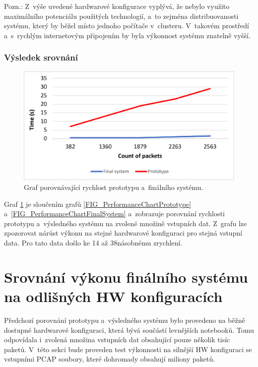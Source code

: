 \vspace{0.5cm}
\noindent Pozn.: Z~výše uvedené hardwarové konfigurace vyplývá, že nebylo využito maximálního potenciálu použitých technologií, a~to zejména distribuovanosti systému, který by běžel místo jednoho počítače v~clusteru. V~takovém prostředí a~s~rychlým internetovým připojením by byla výkonnost systému znatelně vyšší.

\subsubsection{Výsledek srovnání}

\begin{figure}[!h]
    \centering
    \includegraphics[width=15cm]{template-fig/PerformanceChartComparePrototypeAndFinal.pdf}
    \caption{Graf porovnávající rychlost prototypu a~finálního systému.}
    \label{FIG_PerformanceChartComparePrototypeAndFinal}
\end{figure}

\noindent Graf \ref{FIG_PerformanceChartComparePrototypeAndFinal} je sloučením grafů \ref{FIG_PerformanceChartPrototype} a~\ref{FIG_PerformanceChartFinalSystem} a~zobrazuje porovnání rychlosti prototypu a~výsledného systému na zvolené množině vstupních dat. Z~grafu lze zpozorovat nárůst výkonu na stejné hardwarové konfiguraci pro stejná vstupní data. Pro tato data došlo ke 14 až 38násobnému zrychlení.

\section{Srovnání výkonu finálního systému na odlišných HW konfiguracích}
Předchozí porovnání prototypu a~výsledného systému bylo provedeno na běžně dostupné hardwarové konfiguraci, která bývá součástí levnějších notebooků. Tomu odpovídala i~zvolená množina vstupních dat obsahující pouze několik tisíc paketů. V~této sekci bude proveden test výkonnosti na silnější HW konfiguraci se vstupními PCAP soubory, které dohromady obsahují miliony paketů.

